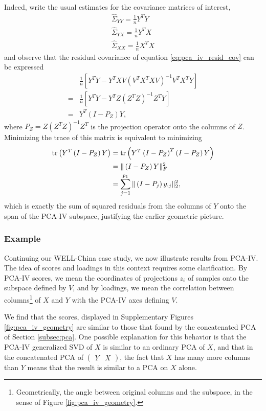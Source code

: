 \documentclass{article}
\begin{document}
Indeed, write the usual estimates for the covariance matrices of interest,
\begin{align*}
  \hat{\Sigma}_{YY} = \frac{1}{n}Y^{T}Y \\
  \hat{\Sigma}_{YX} = \frac{1}{n}Y^{T}X \\
  \hat{\Sigma}_{XX} = \frac{1}{n}X^{T}X
\end{align*}
and observe that the residual covariance of equation \ref{eq:pca_iv_resid_cov}
can be expressed
\begin{align*}
  &\frac{1}{n}\left[Y^{T}Y -
    Y^{T}XV\left(V^{T}X^{T}XV\right)^{-1}V^{T}X^{T}Y\right] \\
  = &\frac{1}{n}\left[Y^{T}Y - Y^{T}Z\left(Z^{T}Z\right)^{-1}Z^{T}Y\right] \\
  = &Y^T \left(I - P_{Z}\right)Y,
\end{align*}
where $P_{Z} = Z\left(Z^{T}Z\right)^{-1}Z^{T}$ is the projection operator onto
the columns of $Z$. Minimizing the trace of this matrix is equivalent to
minimizing
\begin{align*}
  \mathop\mathrm{tr}\left(Y^{T}\left(I - P_{Z}\right)Y\right) &=
  \mathop\mathrm{tr}\left(Y^{T}\left(I - P_{Z}\right)^{T}\left(I -
      P_{Z}\right)Y\right) \\
  &= \|\left(I - P_{Z}\right)Y\|_{F}^{2} \\
  &= \sum_{j = 1}^{p_{1}}\|\left(I - P_{j}\right)y_{\cdot j}\|^{2}_{2},
\end{align*}
which is exactly the sum of squared residuals from the columns of $Y$ onto the
span of the PCA-IV subspace, justifying the earlier geometric picture.

\subsubsection{Example}
\label{subsec:pcaiv_example}

Continuing our WELL-China case study, we now illustrate results from PCA-IV. The
idea of scores and loadings in this context requires some clarification. By
PCA-IV scores, we mean the coordinates of projections $z_{i}$ of samples onto
the subspace defined by $V$, and by loadings, we mean the correlation between
columns\footnote{Geometrically, the angle between original columns and the
  subspace, in the sense of Figure \ref{fig:pca_iv_geometry}.} of $X$ and $Y$
with the PCA-IV axes defining $V$.

We find that the scores, displayed in Supplementary Figures
\ref{fig:pca_iv_geometry} are similar to those that found by the concatenated
PCA of Section \ref{subsec:pca}. One possible explanation for this behavior is
that the PCA-IV generalized SVD of $X$ is similar to an ordinary PCA of $X$, and
that in the concatenated PCA of $\begin{pmatrix}Y & X\end{pmatrix}$, the fact
  that $X$ has many more columns than $Y$ means that the result is similar to a
  PCA on $X$ alone.
\end{document}
